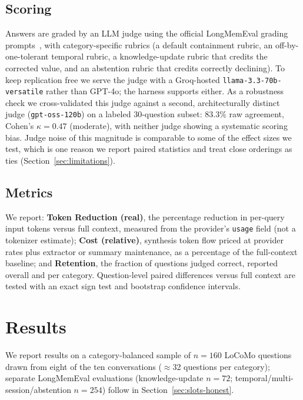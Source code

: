 \documentclass[conference]{IEEEtran}
\begin{document}
\subsection{Scoring}
\label{sec:scoring}

Answers are graded by an LLM judge using the official LongMemEval grading prompts~\cite{wu2024longmemeval}, with category-specific rubrics (a default containment rubric, an off-by-one-tolerant temporal rubric, a knowledge-update rubric that credits the corrected value, and an abstention rubric that credits correctly declining). To keep replication free we serve the judge with a Groq-hosted \texttt{llama-3.3-70b-versatile} rather than GPT-4o; the harness supports either. As a robustness check we cross-validated this judge against a second, architecturally distinct judge (\texttt{gpt-oss-120b}) on a labeled 30-question subset: 83.3\% raw agreement, Cohen's $\kappa=0.47$ (moderate), with neither judge showing a systematic scoring bias. Judge noise of this magnitude is comparable to some of the effect sizes we test, which is one reason we report paired statistics and treat close orderings as ties (Section~\ref{sec:limitations}).

\subsection{Metrics}

We report: \textbf{Token Reduction (real)}, the percentage reduction in per-query input tokens versus full context, measured from the provider's \texttt{usage} field (not a tokenizer estimate); \textbf{Cost (relative)}, synthesis token flow priced at provider rates plus extractor or summary maintenance, as a percentage of the full-context baseline; and \textbf{Retention}, the fraction of questions judged correct, reported overall and per category. Question-level paired differences versus full context are tested with an exact sign test and bootstrap confidence intervals.

\section{Results}
\label{sec:results}

We report results on a category-balanced sample of $n{=}160$ LoCoMo questions drawn from eight of the ten conversations ($\approx$32 questions per category); separate LongMemEval evaluations (knowledge-update $n{=}72$; temporal/multi-session/abstention $n{=}254$) follow in Section~\ref{sec:slots-honest}.
\end{document}
